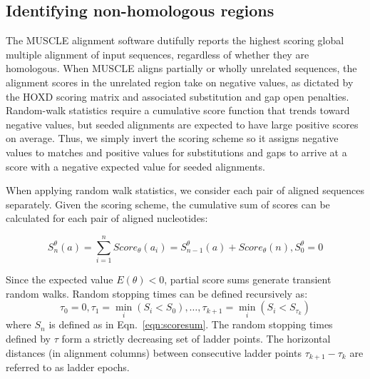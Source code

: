 \documentclass{llncs}
\begin{document}
\subsection{Identifying non-homologous regions}

The MUSCLE alignment software dutifully reports the highest scoring global multiple alignment of input sequences, regardless of whether they are homologous.  When MUSCLE aligns partially or wholly unrelated sequences, the alignment scores in the unrelated region take on negative values, as dictated by the HOXD scoring matrix and associated substitution and gap open penalties.  Random-walk statistics require a cumulative score function that trends toward negative values, but seeded alignments are expected to have large positive scores on average.  Thus, we simply invert the scoring scheme so it assigns negative values to matches and positive values for substitutions and gaps to arrive at a score with a negative expected value for seeded alignments.

When applying random walk statistics, we consider each pair of aligned sequences separately.  Given the scoring scheme, the cumulative sum of scores can be calculated for each pair of aligned nucleotides:

\begin{equation}
\label{eqn:scoresum}
S_n^\theta(a) = \sum_{i=1}^{n} Score_\theta(a_i) = S_{n-1}^\theta(a) + Score_\theta(n), S_0^\theta = 0
\end{equation}

Since the expected value $E(\theta) < 0$, partial score sums generate transient random walks.  Random stopping times can be defined recursively as:
\begin{equation}
\label{eqn:stoppingtimes}
\tau_0 = 0, \tau_1 = \min_i(S_i < S_0),\dots,\tau_{k+1} = \min_i(S_i < S_{\tau_k})
\end{equation}
where $S_n$ is defined as in Eqn.~\ref{eqn:scoresum}.  The random stopping times defined by $\tau$ form a strictly decreasing set of ladder points.  The horizontal distances (in alignment columns) between consecutive ladder points $\tau_{k+1}-\tau_{k}$ are referred to as ladder epochs.
\end{document}
